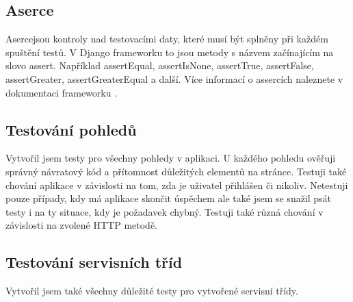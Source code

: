 \subsection{Aserce}
Asercejsou kontroly nad testovacími daty, které musí být splněny při každém spuštění testů. V Django frameworku to jsou metody s názvem začínajícím na slovo assert. Například assertEqual, assertIsNone, assertTrue, assertFalse, assertGreater, assertGreaterEqual a další. Více informací o assercích naleznete v dokumentaci frameworku \cite{django-testing-tools}.

\subsection{Testování pohledů}
Vytvořil jsem testy pro všechny pohledy v aplikaci. U každého pohledu ověřuji správný návratový kód a přítomnost důležitých elementů na stránce. Testuji také chování aplikace v závislosti na tom, zda je uživatel přihlášen či nikoliv. Netestuji pouze případy, kdy má aplikace skončit úspěchem ale také jsem se snažil psát testy i na ty situace, kdy je požadavek chybný. Testuji také různá chování v závislosti na zvolené HTTP metodě.

\subsection{Testování servisních tříd}
Vytvořil jsem také všechny důležité testy pro vytvořené servisní třídy.
